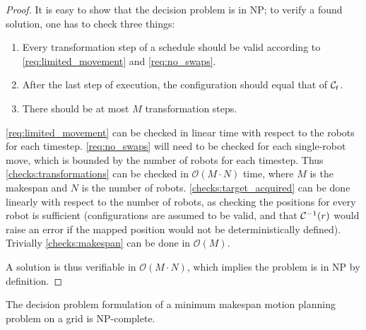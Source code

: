 \begin{proof}
	It is easy to show that the decision problem is in NP; to verify a found solution, one has to check three things:
	\begin{enumerate}
		\item Every transformation step of a schedule should be valid according to \cref{req:limited_movement} and \cref{req:no_swaps}.\label{checks:transformations}
		\item After the last step of execution, the configuration should equal that of \(\mathcal{C}_{t}\).\label{checks:target_acquired}
		\item There should be at most \(M\) transformation steps.\label{checks:makespan}
	\end{enumerate}
	\cref{req:limited_movement} can be checked in linear time with respect to the robots for each timestep. 
	\cref{req:no_swaps} will need to be checked for each single-robot move, which is bounded by the number of robots for each timestep. 
	Thus \cref{checks:transformations} can be checked in \(\mathcal{O}(M \cdot N)\) time, where \(M\) is the makespan and \(N\) is the number of robots.
	\cref{checks:target_acquired} can be done linearly with respect to the number of robots, as checking the positions for every robot is sufficient (configurations are assumed to be valid, and that \(\mathcal{C}_{}^{-1}(r)\) would raise an error if the mapped position would not be deterministically defined).
	Trivially \cref{checks:makespan} can be done in \(\mathcal{O}(M)\). 

	A solution is thus verifiable in \(\mathcal{O}(M \cdot N)\), which implies the problem is in NP by definition.
\end{proof}

\begin{theorem}\label{thm:npc}
	The decision problem formulation of a minimum makespan motion planning problem on a grid is NP-complete.
\end{theorem}

